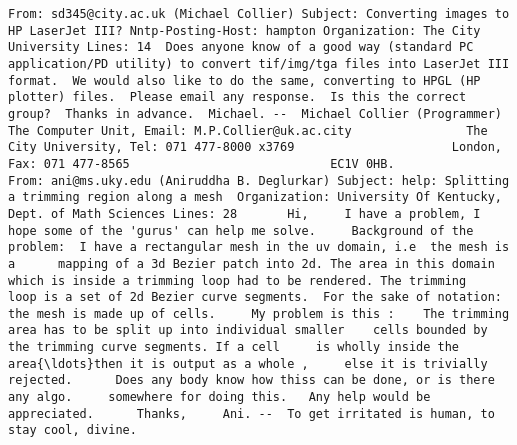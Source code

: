 \documentclass[11pt]{article}
\begin{document}
    \begin{Verbatim}[commandchars=\\\{\}]
From: sd345@city.ac.uk (Michael Collier) Subject: Converting images to HP LaserJet III? Nntp-Posting-Host: hampton Organization: The City University Lines: 14  Does anyone know of a good way (standard PC application/PD utility) to convert tif/img/tga files into LaserJet III format.  We would also like to do the same, converting to HPGL (HP plotter) files.  Please email any response.  Is this the correct group?  Thanks in advance.  Michael. --  Michael Collier (Programmer)                 The Computer Unit, Email: M.P.Collier@uk.ac.city                The City University, Tel: 071 477-8000 x3769                      London, Fax: 071 477-8565                            EC1V 0HB. 
From: ani@ms.uky.edu (Aniruddha B. Deglurkar) Subject: help: Splitting a trimming region along a mesh  Organization: University Of Kentucky, Dept. of Math Sciences Lines: 28    	Hi,  	I have a problem, I hope some of the 'gurus' can help me solve.  	Background of the problem: 	I have a rectangular mesh in the uv domain, i.e  the mesh is a  	mapping of a 3d Bezier patch into 2d. The area in this domain 	which is inside a trimming loop had to be rendered. The trimming 	loop is a set of 2d Bezier curve segments. 	For the sake of notation: the mesh is made up of cells.  	My problem is this : 	The trimming area has to be split up into individual smaller 	cells bounded by the trimming curve segments. If a cell 	is wholly inside the area{\ldots}then it is output as a whole , 	else it is trivially rejected.   	Does any body know how thiss can be done, or is there any algo.  	somewhere for doing this.  	Any help would be appreciated.  	Thanks,  	Ani. --  To get irritated is human, to stay cool, divine. 

\end{Verbatim}
\end{document}
